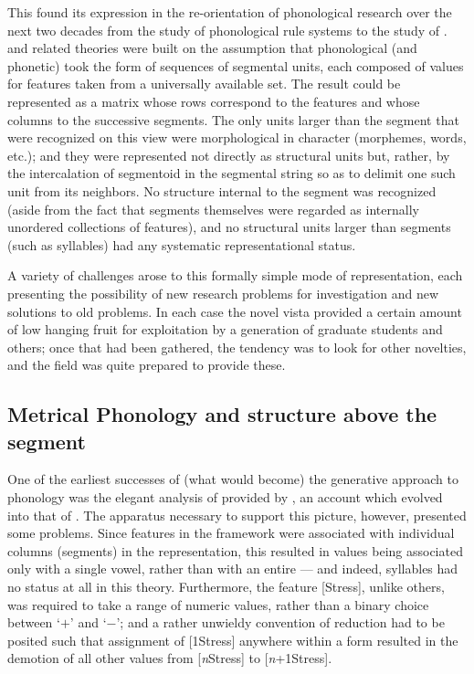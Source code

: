 This found its expression in the re-orientation of phonological
research over the next two decades from the study of phonological rule
systems to the study of . \textsl{} and related
theories were built on the assumption that phonological (and phonetic)
 took the form of sequences of segmental units, each
composed of values for features taken from a universally available
set. The result could be represented as a matrix whose rows correspond
to the features and whose columns to the successive segments. The only
units larger than the segment that were recognized on this view were
morphological in character (morphemes, words, etc.); and they were
represented not directly as structural units but, rather, by the
intercalation of segmentoid  in the segmental string so as
to delimit one such unit from its neighbors. No structure internal to
the segment was recognized (aside from the fact that segments
themselves were regarded as internally unordered collections of
features), and no structural units larger than segments (such as
syllables) had any systematic representational status.

A variety of challenges arose to this formally simple mode of
representation, each presenting the possibility of new research
problems for investigation and new solutions to old problems. In each
case the novel vista provided a certain amount of low hanging fruit
for exploitation by a generation of graduate students and others; once
that had been gathered, the tendency was to look for other novelties,
and the field was quite prepared to provide these.

\subsection{Metrical Phonology and structure above the segment}
\label{sec:smetrical-phon}


One of the earliest successes of (what would become) the generative
approach to phonology was the elegant analysis of  
provided by \citet{chomsky:halle:lukoff}, an account which evolved
into that of \citet{spe}. The apparatus necessary to support this
picture, however, presented some problems. Since features in the
\textsl{} framework were associated with individual columns
(segments) in the representation, this resulted in  values being
associated only with a single vowel, rather than with an entire
 --- and indeed, syllables had no status at all in this
theory. Furthermore, the feature {[Stress]}, unlike others, was
required to take a range of numeric values, rather than a binary
choice between `$+$' and `$-$'; and a rather unwieldy convention of
 reduction had to be posited such that assignment of {[1Stress]}
anywhere within a form resulted in the demotion of all other values
from {[\emph{n}Stress]} to {[\emph{n}+1Stress]}.

